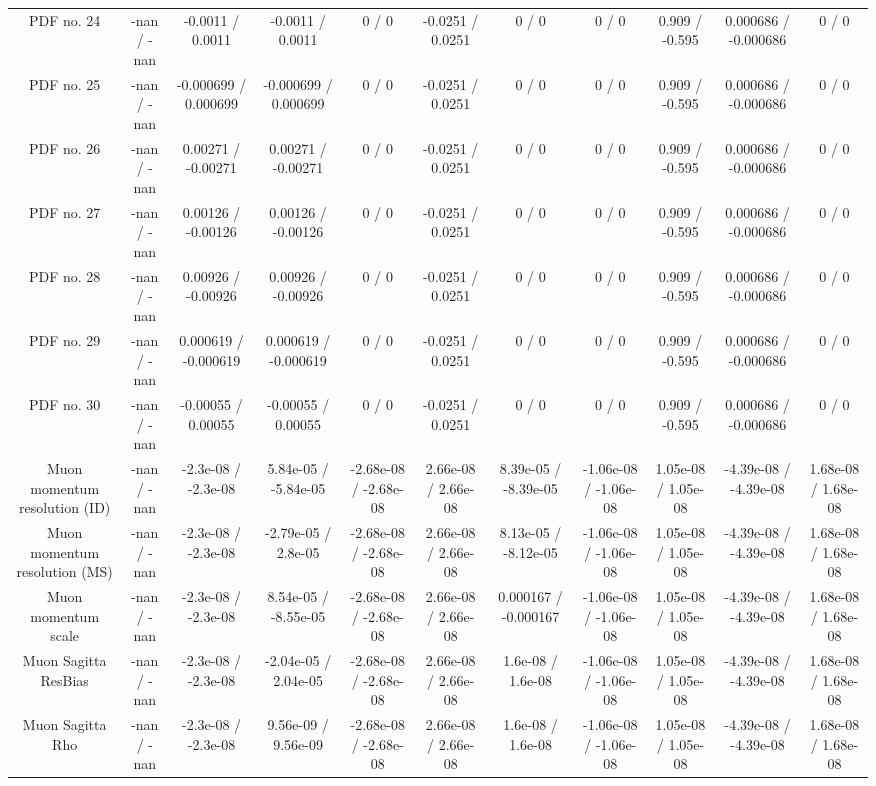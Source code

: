 \begin{table}[htbp]
\begin{center}
\begin{tabular}{|c|c|c|c|c|c|c|c|c|c|c|}
  PDF no. 24 & -nan / -nan & -0.0011 / 0.0011 & -0.0011 / 0.0011 & 0 / 0 & -0.0251 / 0.0251 & 0 / 0 & 0 / 0 & 0.909 / -0.595 & 0.000686 / -0.000686 & 0 / 0 \\ 
  PDF no. 25 & -nan / -nan & -0.000699 / 0.000699 & -0.000699 / 0.000699 & 0 / 0 & -0.0251 / 0.0251 & 0 / 0 & 0 / 0 & 0.909 / -0.595 & 0.000686 / -0.000686 & 0 / 0 \\ 
  PDF no. 26 & -nan / -nan & 0.00271 / -0.00271 & 0.00271 / -0.00271 & 0 / 0 & -0.0251 / 0.0251 & 0 / 0 & 0 / 0 & 0.909 / -0.595 & 0.000686 / -0.000686 & 0 / 0 \\ 
  PDF no. 27 & -nan / -nan & 0.00126 / -0.00126 & 0.00126 / -0.00126 & 0 / 0 & -0.0251 / 0.0251 & 0 / 0 & 0 / 0 & 0.909 / -0.595 & 0.000686 / -0.000686 & 0 / 0 \\ 
  PDF no. 28 & -nan / -nan & 0.00926 / -0.00926 & 0.00926 / -0.00926 & 0 / 0 & -0.0251 / 0.0251 & 0 / 0 & 0 / 0 & 0.909 / -0.595 & 0.000686 / -0.000686 & 0 / 0 \\ 
  PDF no. 29 & -nan / -nan & 0.000619 / -0.000619 & 0.000619 / -0.000619 & 0 / 0 & -0.0251 / 0.0251 & 0 / 0 & 0 / 0 & 0.909 / -0.595 & 0.000686 / -0.000686 & 0 / 0 \\ 
  PDF no. 30 & -nan / -nan & -0.00055 / 0.00055 & -0.00055 / 0.00055 & 0 / 0 & -0.0251 / 0.0251 & 0 / 0 & 0 / 0 & 0.909 / -0.595 & 0.000686 / -0.000686 & 0 / 0 \\ 
  Muon momentum resolution (ID) & -nan / -nan & -2.3e-08 / -2.3e-08 & 5.84e-05 / -5.84e-05 & -2.68e-08 / -2.68e-08 & 2.66e-08 / 2.66e-08 & 8.39e-05 / -8.39e-05 & -1.06e-08 / -1.06e-08 & 1.05e-08 / 1.05e-08 & -4.39e-08 / -4.39e-08 & 1.68e-08 / 1.68e-08 \\ 
  Muon momentum resolution (MS) & -nan / -nan & -2.3e-08 / -2.3e-08 & -2.79e-05 / 2.8e-05 & -2.68e-08 / -2.68e-08 & 2.66e-08 / 2.66e-08 & 8.13e-05 / -8.12e-05 & -1.06e-08 / -1.06e-08 & 1.05e-08 / 1.05e-08 & -4.39e-08 / -4.39e-08 & 1.68e-08 / 1.68e-08 \\ 
  Muon momentum scale & -nan / -nan & -2.3e-08 / -2.3e-08 & 8.54e-05 / -8.55e-05 & -2.68e-08 / -2.68e-08 & 2.66e-08 / 2.66e-08 & 0.000167 / -0.000167 & -1.06e-08 / -1.06e-08 & 1.05e-08 / 1.05e-08 & -4.39e-08 / -4.39e-08 & 1.68e-08 / 1.68e-08 \\ 
  Muon Sagitta ResBias & -nan / -nan & -2.3e-08 / -2.3e-08 & -2.04e-05 / 2.04e-05 & -2.68e-08 / -2.68e-08 & 2.66e-08 / 2.66e-08 & 1.6e-08 / 1.6e-08 & -1.06e-08 / -1.06e-08 & 1.05e-08 / 1.05e-08 & -4.39e-08 / -4.39e-08 & 1.68e-08 / 1.68e-08 \\ 
  Muon Sagitta Rho & -nan / -nan & -2.3e-08 / -2.3e-08 & 9.56e-09 / 9.56e-09 & -2.68e-08 / -2.68e-08 & 2.66e-08 / 2.66e-08 & 1.6e-08 / 1.6e-08 & -1.06e-08 / -1.06e-08 & 1.05e-08 / 1.05e-08 & -4.39e-08 / -4.39e-08 & 1.68e-08 / 1.68e-08 \\ 

\end{tabular}
\end{center}
\end{table}
